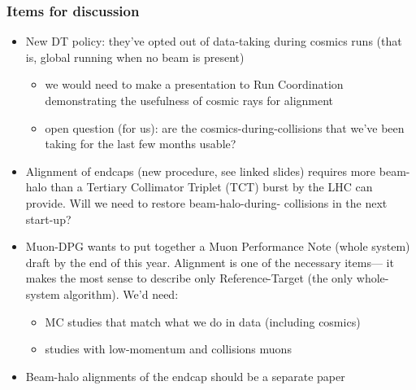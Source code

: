 \documentclass[compress]{beamer}
\begin{document}

\small

\begin{frame}
\frametitle{Items for discussion}
\begin{itemize}
\item New DT policy: they've opted out of data-taking during cosmics
   runs (that is, global running when no beam is present)
\begin{itemize}
\item we would need to make a presentation to Run Coordination
  demonstrating the usefulness of cosmic rays for alignment
\item open question (for us): are the cosmics-during-collisions that
  we've been taking for the last few months usable?
\end{itemize}

\item Alignment of endcaps (new procedure, see linked slides) requires
  more beam-halo than a Tertiary Collimator Triplet (TCT) burst by the
  LHC can provide.  Will we need to restore
  beam-halo-during- collisions in the next start-up?

\item Muon-DPG wants to put together a Muon Performance Note (whole
  system) draft by the end of this year.  Alignment is one of the
  necessary items--- it makes the most sense to describe only
  Reference-Target (the only whole-system algorithm).  We'd need:
\begin{itemize}
\item MC studies that match what we do in data (including cosmics)
\item studies with low-momentum and collisions muons
\end{itemize}

\item Beam-halo alignments of the endcap should be a separate paper
\end{itemize}
\label{numpages}
\end{frame}

\end{document}
